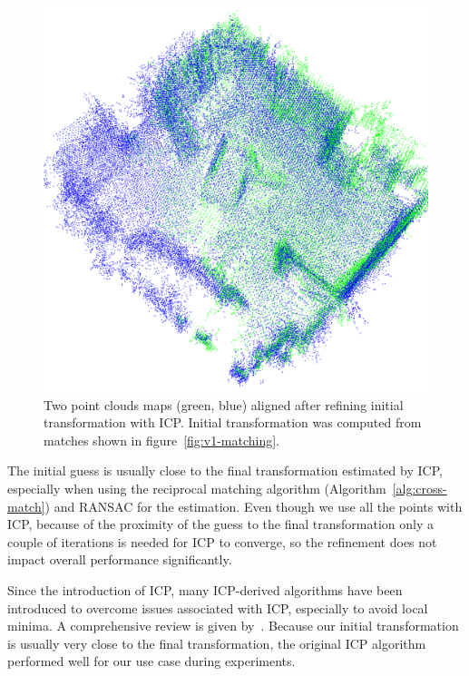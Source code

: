 \begin{figure}
    \centering
    \includegraphics[width=\textwidth]{../img/v1-refined.png}
    \caption[Aligned point clouds]{Two point clouds maps (green, blue) aligned after refining initial transformation with \gls{ICP}. Initial transformation was computed from matches shown in figure~\ref{fig:v1-matching}.}
    \label{fig:v1-refined}
\end{figure}

The initial guess is usually close to the final transformation estimated by \gls{ICP}, especially when using the reciprocal matching algorithm (Algorithm~\ref{alg:cross-match}) and \gls{RANSAC} for the estimation. Even though we use all the points with \gls{ICP}, because of the proximity of the guess to the final transformation only a couple of iterations is needed for \gls{ICP} to converge, so the refinement does not impact overall performance significantly.

Since the introduction of \gls{ICP}, many \gls{ICP}-derived algorithms have been introduced to overcome issues associated with \gls{ICP}, especially to avoid local minima. A comprehensive review is given by~\citet{pomerleau2015reviewregistration}. Because our initial transformation is usually very close to the final transformation, the original \gls{ICP} algorithm performed well for our use case during experiments.

